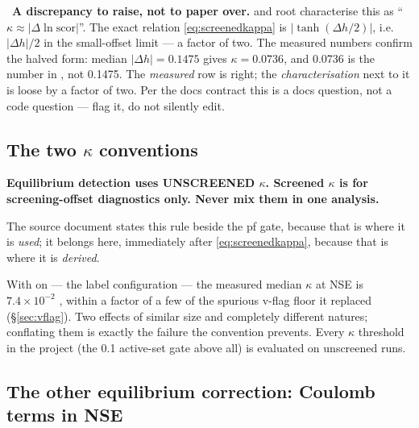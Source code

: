 \begin{warn}
\warnglyph{}~\textbf{A discrepancy to raise, not to paper over.}
 and root  characterise this as
``$\kappa \approx |\Delta \ln \mathrm{scor}|$''. The exact relation
\eqref{eq:screenedkappa} is $|\tanh(\Delta h/2)|$, i.e.\ \textbf{$|\Delta h|/2$}
in the small-offset limit --- a factor of two. The measured numbers confirm the
halved form: median $|\Delta h| = 0.1475$ gives $\kappa = 0.0736$, and 0.0736 is
the number in , not 0.1475. The \emph{measured} row is right;
the \emph{characterisation} next to it is loose by a factor of two. Per the docs
contract this is a docs question, not a code question --- flag it, do not
silently edit.
\end{warn}

\subsection{The two \texorpdfstring{$\kappa$}{kappa} conventions}
\label{sec:two-kappa}

\begin{invariant}
\textbf{Equilibrium detection uses UNSCREENED $\kappa$. Screened $\kappa$ is for
screening-offset diagnostics only. Never mix them in one analysis.}
\end{invariant}

The source document states this rule beside the pf gate, because that is where
it is \emph{used}; it belongs here, immediately after \eqref{eq:screenedkappa},
because that is where it is \emph{derived}.

With  on --- the label configuration --- the measured median
$\kappa$ at NSE is \textbf{$7.4\times10^{-2}$} , within a
factor of a few of the spurious v-flag floor it replaced
(\S\ref{sec:vflag}). Two effects of similar size and completely different
natures; conflating them is exactly the failure the convention prevents. Every
$\kappa$ threshold in the project (the 0.1 active-set gate above all) is
evaluated on unscreened runs.

\subsection{The other equilibrium correction: Coulomb terms in NSE}
\label{sec:nse-coulomb}

